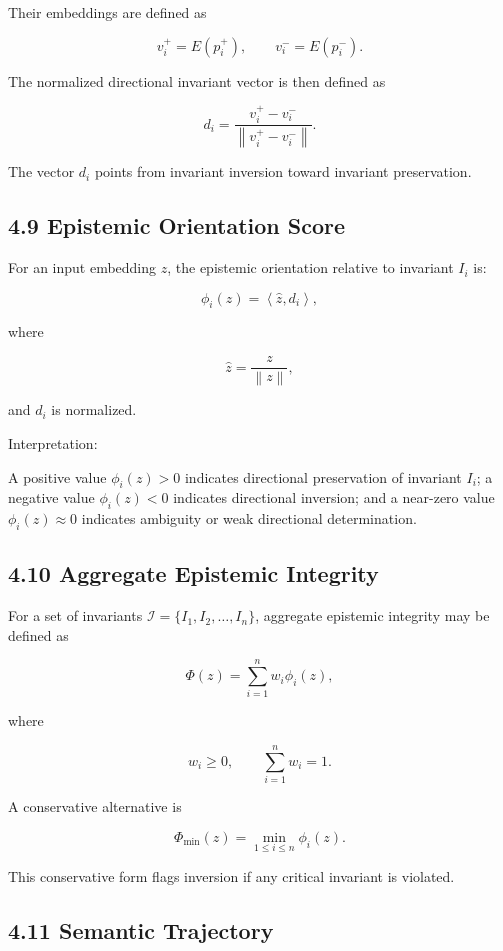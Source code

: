 \documentclass[11pt]{article}
\begin{document}
Their embeddings are defined as

$$
v_i^{+}=E(p_i^{+}),
\qquad
v_i^{-}=E(p_i^{-}).
$$

The normalized directional invariant vector is then defined as

$$
d_i
=
\frac{
v_i^{+}-v_i^{-}
}{
\left\lVert v_i^{+}-v_i^{-}\right\rVert
}.
$$

The vector $d_i$ points from invariant inversion toward invariant preservation.

\subsection{4.9 Epistemic Orientation Score}

For an input embedding $z$, the epistemic orientation relative to invariant $I_i$ is:

$$
\phi_i(z)
=
\left\langle \hat{z},d_i\right\rangle,
$$

where

$$
\hat{z}
=
\frac{z}{\left\lVert z\right\rVert},
$$

and $d_i$ is normalized.

Interpretation:

A positive value $\phi_i(z)>0$ indicates directional preservation of invariant $I_i$; a negative value $\phi_i(z)<0$ indicates directional inversion; and a near-zero value $\phi_i(z)\approx 0$ indicates ambiguity or weak directional determination.

\subsection{4.10 Aggregate Epistemic Integrity}

For a set of invariants $\mathcal{I}=\{I_1,I_2,\dots,I_n\}$, aggregate epistemic integrity may be defined as

$$
\Phi(z)
=
\sum_{i=1}^{n} w_i \phi_i(z),
$$

where

$$
w_i\geq 0,
\qquad
\sum_{i=1}^{n} w_i = 1.
$$

A conservative alternative is

$$
\Phi_{\min}(z)
=
\min_{1\leq i\leq n}
\phi_i(z).
$$

This conservative form flags inversion if any critical invariant is violated.

\subsection{4.11 Semantic Trajectory}
\end{document}
